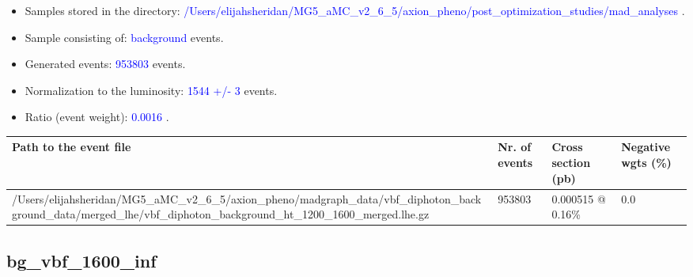 \documentclass[a4paper, 10pt]{article}
\begin{document}
\begin{itemize}
  \item Samples stored in the directory: \textcolor{blue}{/\-Users/\-elijahsheridan/\-MG5\_aMC\_v2\_6\_5/\-axion\_pheno/\-post\_optimization\_studies/\-mad\_analyses} .
   \item Sample consisting of: \textcolor{blue}{background}  events.
   \item Generated events: \textcolor{blue}{953803 }  events.
   \item Normalization to the luminosity: \textcolor{blue}{1544}\textcolor{blue}{ +/\-- }\textcolor{blue}{3 }  events.
   \item Ratio (event weight): \textcolor{blue}{0.0016 } .  
 
\end{itemize}
\begin{table}[H]
  \begin{center}
    \begin{tabular}{|m{55.0mm}|m{25.0mm}|m{30.0mm}|m{30.0mm}|}
      \hline
      {\cellcolor{yellow}         Path to the event file}& {\cellcolor{yellow}         Nr. of events}& {\cellcolor{yellow}         Cross section (pb)}& {\cellcolor{yellow}         Negative wgts (\%)}\\
      \hline
      {\cellcolor{white}          /\-Users/\-elijahsheridan/\-MG5\_aMC\_v2\_6\_5/\-axion\_pheno/\-madgraph\_data/\-vbf\_diphoton\_background\_data/\-merged\_lhe/\-vbf\_diphoton\_background\_ht\_1200\_1600\_merged.lhe.gz}& {\cellcolor{white}          953803}& {\cellcolor{white}          0.000515 @ 0.16\%}& {\cellcolor{white}          0.0}\\
\hline
    \end{tabular}
  \end{center}
\end{table}

\subsection{ bg\_vbf\_1600\_inf}
\end{document}
